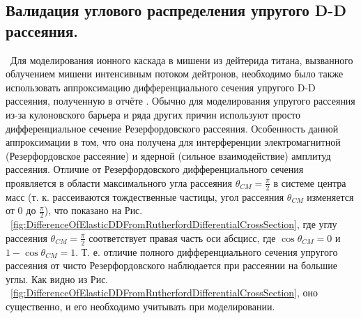 \documentclass[a4paper,12pt]{article}
\begin{document}
\begin{large}
\section{Валидация углового распределения упругого D-D рассеяния.}
\label{ValElasticDD}
\
	Для моделирования ионного каскада в мишени из дейтерида титана, вызванного облучением мишени интенсивным потоком дейтронов, необходимо было также использовать аппроксимацию дифференциального сечения упругого D-D рассеяния, полученную в отчёте \cite{70/778-T}.
	Обычно для моделирования упругого рассеяния из-за кулоновского барьера и ряда других причин используют просто дифференциальное сечение Резерфордовского рассеяния.
	Особенность данной аппроксимации в том, что она получена для интерференции электромагнитной (Резерфордовское рассеяние) и ядерной (сильное взаимодействие) амплитуд рассеяния.
	Отличие от Резерфордовского дифференциального сечения проявляется в области максимального угла рассеяния $\theta_{CM}=\frac{\pi}{2}$ в системе центра масс (т. к. рассеиваются тождественные частицы, угол рассеяния $\theta_{CM}$ изменяется от 0 до $\frac{\pi}{2}$), что показано на Рис. ~\ref{fig:DifferenceOfElasticDDFromRutherfordDifferentialCrossSection}, где углу рассеяния $\theta_{CM}=\frac{\pi}{2}$ соответствует правая часть оси абсцисс, где $\cos{\theta_{CM}}=0$ и $1-\cos{\theta_{CM}}=1$.
	Т. е. отличие полного дифференциального сечения упругого рассеяния от чисто Резерфордовского наблюдается при рассеянии на большие углы.
	Как видно из Рис. ~\ref{fig:DifferenceOfElasticDDFromRutherfordDifferentialCrossSection}, оно существенно, и его необходимо учитывать при моделировании.
	

\end{large}
\end{document}
